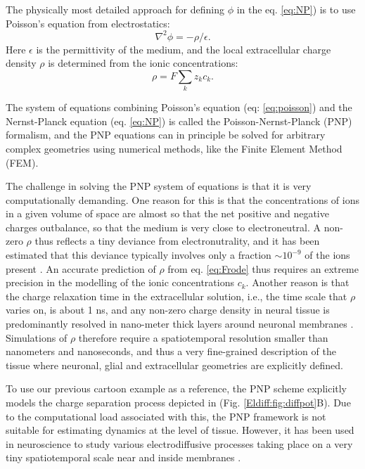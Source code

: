\subsubsection{}
The physically most detailed approach for defining $\phi$ in the eq. \ref{eq:NP}) is to use Poisson's equation from electrostatics:
\begin{equation}
\nabla^2 \phi = -\rho/\epsilon.
\label{eq:poisson}
\end{equation}
Here $\epsilon$ is the permittivity of the medium, and the local extracellular charge density $\rho$ is determined from the ionic concentrations: 
\begin{equation}
\rho = F \sum_k z_k c_k.
\label{eq:Frode}
\end{equation}

The system of equations combining Poisson's equation (eq: \ref{eq:poisson}) and the Nernst-Planck equation (eq. \ref{eq:NP})
is called the Poisson-Nernst-Planck (PNP) formalism, and the PNP equations can in principle be solved for arbitrary complex geometries using numerical methods, like the Finite Element Method (FEM). 

The challenge in solving the PNP system of equations is that it is very computationally demanding. One reason for this is that the concentrations of ions in a given volume of space are almost so that the net positive and negative charges outbalance, so that the medium is very close to electroneutral. A non-zero $\rho$ thus reflects a tiny deviance from electronutrality, and it has been estimated that this deviance typically involves only a fraction $\sim 10^{-9}$ of the ions present \cite{Aguilella1986}. An accurate prediction of $\rho$ from eq. \ref{eq:Frode} thus requires an extreme precision in the modelling of the ionic concentrations $c_k$. Another reason is that the charge relaxation time in the extracellular solution, i.e., the time scale that $\rho$ varies on, is about 1 ns, and any non-zero charge density in neural tissue is predominantly resolved in nano-meter thick layers around neuronal membranes \cite{Grodzinsky2011, Gratiy2017}. Simulations of $\rho$ therefore require a spatiotemporal resolution smaller than nanometers and nanoseconds, and thus a very fine-grained description of the tissue where neuronal, glial and extracellular geometries are explicitly defined.

To use our previous cartoon example as a reference, the PNP scheme explicitly models the charge separation process depicted in (Fig. \ref{Eldiff:fig:diffpot}B). Due to the computational load associated with this, the PNP framework is not suitable for estimating dynamics at the level of tissue. However, it has been used in neuroscience to study various electrodiffusive processes taking place on a very tiny spatiotemporal scale near and inside membranes \cite{Leonetti1998, Leonetti2004, Lu2007, Lopreore2008, Nanninga2008, Pods2013, Gardner2015}. 


